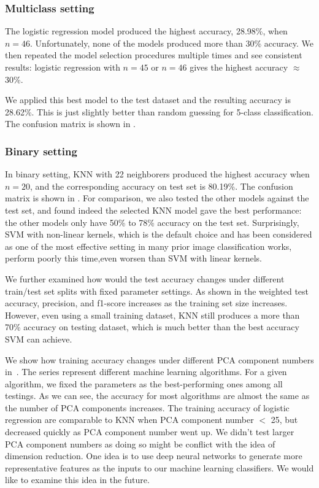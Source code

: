 \subsubsection{Multiclass setting}
The logistic regression model produced the highest accuracy, 28.98\%, when $n = 46$. Unfortunately, none of the models produced more than 30\% accuracy. We then repeated the model selection procedures multiple times and see consistent results:  logistic regression with $n = 45$ or $n = 46$ gives 
the highest accuracy $\approx$ 30\%. 

We applied this best model to the test dataset and the resulting accuracy is 28.62\%. This is 
just slightly better than random guessing for 5-class classification. 
The confusion matrix is shown in . 

\subsubsection{Binary setting}
In binary setting, KNN with 22 neighborers produced the highest accuracy when 
$n = 20$, and the corresponding accuracy on test set is 80.19\%. The confusion matrix is shown in . For comparison, 
we also tested the other models against the test set, and found indeed the selected 
KNN model gave the best performance: the other models only have 50\% to 78\% 
accuracy on the test set. Surprisingly, SVM with non-linear kernels, which is 
the default choice and has been considered as one of the most effective setting in many prior image 
classification works, perform poorly this time,even worsen than SVM with linear kernels. 

We further examined how would the test accuracy 
changes under different train/test set splits with fixed parameter settings. As shown in  
the weighted test accuracy, precision, and f1-score increases as the training set 
size increases. However, even using a small training dataset, KNN still produces a 
more than 70\% accuracy on testing dataset, which is much better than the best accuracy 
SVM can achieve.  

We show how training accuracy changes under different PCA component numbers in~. The series represent different machine learning 
algorithms. For a given algorithm, we fixed the parameters as the best-performing 
ones among all testings. As we can see, the accuracy for most algorithms 
are almost the same as the number of PCA components increases. The training 
accuracy of logistic regression are comparable to KNN when PCA component 
number $<$ 25, but decreased quickly as PCA component number went up. 
We didn't test larger PCA component numbers as doing so might be conflict with the idea of dimension reduction. 
One idea is to use deep neural networks to generate more representative features 
as the inputs to our machine learning classifiers. We would like to examine 
this idea in the future.

